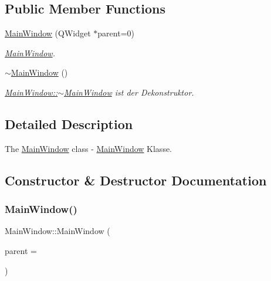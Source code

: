 \subsection*{Public Member Functions}
\begin{DoxyCompactItemize}
\item 
\hyperlink{class_main_window_a8b244be8b7b7db1b08de2a2acb9409db}{Main\+Window} (Q\+Widget $\ast$parent=0)
\begin{DoxyCompactList}\small\item\em \hyperlink{class_main_window}{Main\+Window}. \end{DoxyCompactList}\item 
\hyperlink{class_main_window_ae98d00a93bc118200eeef9f9bba1dba7}{$\sim$\+Main\+Window} ()
\begin{DoxyCompactList}\small\item\em \hyperlink{class_main_window_ae98d00a93bc118200eeef9f9bba1dba7}{Main\+Window\+::$\sim$\+Main\+Window} ist der Dekonstruktor. \end{DoxyCompactList}\end{DoxyCompactItemize}


\subsection{Detailed Description}
The \hyperlink{class_main_window}{Main\+Window} class -\/ \hyperlink{class_main_window}{Main\+Window} Klasse. 

\subsection{Constructor \& Destructor Documentation}
\mbox{\label{class_main_window_a8b244be8b7b7db1b08de2a2acb9409db}} 
\subsubsection{\texorpdfstring{Main\+Window()}{MainWindow()}}
{\footnotesize\ttfamily Main\+Window\+::\+Main\+Window (\begin{DoxyParamCaption}\item[{Q\+Widget $\ast$}]{parent = {} }\end{DoxyParamCaption})\hspace{0.3cm}{\ttfamily [explicit]}}




